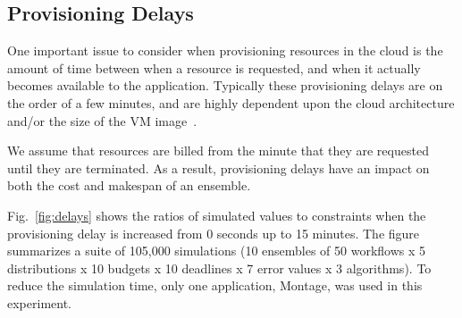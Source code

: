 \documentclass[conference]{IEEEtran}
\begin{document}
\subsection{Provisioning Delays}
\label{sec:delays}

One important issue to consider when provisioning resources in the cloud is
the amount of time between when a resource is requested, and when it actually
becomes available to the application. Typically these provisioning delays are
on the order of a few minutes, and are highly dependent upon the cloud architecture
and/or the size of the VM image~\cite{Nurmi2008b}.

We assume that resources are billed from the minute that they are requested
until they are terminated.  As a result, provisioning delays have an impact on
both the cost and makespan of an ensemble.

Fig.~\ref{fig:delays} shows the ratios of simulated values to constraints when
the provisioning delay is increased from 0 seconds up to 15 minutes. The
figure summarizes a suite of 105,000 simulations (10 ensembles of 50 workflows
x 5 distributions x 10 budgets x 10 deadlines x 7 error values x 3
algorithms). To reduce the simulation time, only one application, Montage, was
used in this experiment. 

\end{document}
